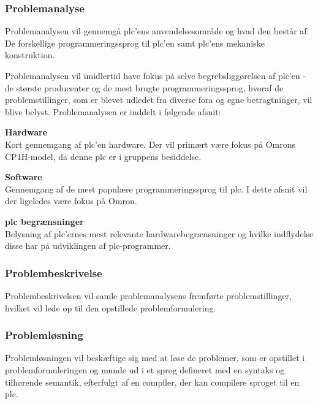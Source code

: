 \label{sec:rapportstruktur}

\subsubsection*{Problemanalyse}
Problemanalysen vil gennemgå \gls{plc}'ens anvendelsesområde og hvad den består af. De forskellige programmeringssprog til \gls{plc}'en samt \gls{plc}'ens mekaniske konstruktion. 

Problemanalysen vil imidlertid have fokus på selve begrebsliggørelsen af \gls{plc}'en - de største producenter og de mest brugte programmeringssprog, hvoraf de problemstillinger, som er blevet udledet fra diverse fora og egne betragtninger, vil blive belyst. Problemanalysen er inddelt i følgende afsnit:

\begin{itemize_small}
    \item \textbf{Hardware} \\
    Kort gennemgang af \gls{plc}'en hardware. Der vil primært være fokus på Omrons CP1H-model, da denne \gls{plc} er i gruppens besiddelse.\\
    \item \textbf{Software} \\
    Gennemgang af de mest populære programmeringssprog til \gls{plc}. I dette afsnit vil der ligeledes være fokus på Omron.\\
    \item \textbf{\gls{plc} begrænsninger} \\
    Belysning af \gls{plc}'ernes mest relevante hardwarebegrænsninger og hvilke indflydelse disse har på udviklingen af \gls{plc}-programmer.\\
\end{itemize_small}

\subsubsection*{Problembeskrivelse}
Problembeskrivelsen vil samle problemanalysens fremførte problemstillinger, hvilket vil lede op til den opstillede problemformulering.

\subsubsection*{Problemløsning}
Problemløsningen vil beskæftige sig med at løse de problemer, som er opstillet i problemformuleringen og munde ud i et sprog defineret med en syntaks og tilhørende semantik, efterfulgt af en compiler, der kan compilere sproget til en \gls{plc}.

